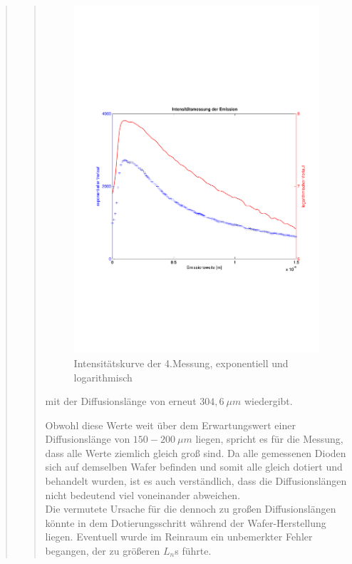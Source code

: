 \begin{quote}
\begin{quote}
        \begin{figure}[H]
                    \centering
                        \includegraphics[scale=0.53, trim = 1cm 6cm 1.5cm 8cm,
                        clip]{./Emissionsbilder/vier/Intensitat_4.pdf}
                        \caption{Intensitätskurve der 4.Messung, exponentiell
                        und logarithmisch}
                            \label{fig:./Emissionsbilder/vier/Intensitat_4.pdf}
        \end{figure}

        mit der Diffusionslänge von erneut $304,6\ \mu m$ wiedergibt.

        \vspace{1.5em}

        Obwohl diese Werte weit über dem Erwartungswert einer Diffusionslänge
        von $150 - 200\ \mu m$ liegen, spricht es für die Messung, dass alle
        Werte ziemlich gleich groß sind. Da alle gemessenen Dioden sich auf
        demselben Wafer befinden und somit alle gleich dotiert und behandelt wurden, ist
        es auch verständlich, dass die Diffusionslängen nicht bedeutend viel
        voneinander abweichen.\\
        Die vermutete Ursache für die dennoch zu großen Diffusionslängen könnte
        in dem Dotierungsschritt während der Wafer-Herstellung liegen. Eventuell
        wurde im Reinraum ein unbemerkter Fehler begangen, der zu größeren
        $L_n$s führte.


\end{quote}
\end{quote}
